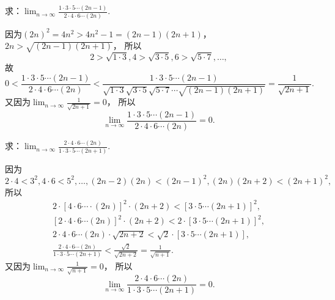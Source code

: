 \begin{example}
求：\(\lim_{n\to\infty} \frac{1 \cdot 3 \cdot 5 \dotsm (2n-1)}{2 \cdot 4 \cdot 6 \dotsm (2n)}\).
\begin{solution}
因为\((2n)^2 = 4n^2 > 4n^2-1 = (2n-1)(2n+1)\)，\(2n > \sqrt{(2n-1)(2n+1)}\)，
所以\[
	2 > \sqrt{1 \cdot 3},
	4 > \sqrt{3 \cdot 5},
	6 > \sqrt{5 \cdot 7},
	\dotsc,
\]
故\[
	0 < \frac{1 \cdot 3 \cdot 5 \dotsm (2n-1)}{2 \cdot 4 \cdot 6 \dotsm (2n)}
	< \frac{1 \cdot 3 \cdot 5 \dotsm (2n-1)}{\sqrt{1 \cdot 3} \sqrt{3 \cdot 5} \sqrt{5 \cdot 7} \dotsm \sqrt{(2n-1)(2n+1)}}
	= \frac{1}{\sqrt{2n+1}}.
\]
又因为\(\lim_{n\to\infty} \frac{1}{\sqrt{2n+1}} = 0\)，
所以\begin{equation}\label{equation:数列极限.重要极限4}
	\lim_{n\to\infty} \frac{1 \cdot 3 \cdot 5 \dotsm (2n-1)}{2 \cdot 4 \cdot 6 \dotsm (2n)} = 0.
\end{equation}
\end{solution}
\end{example}

\begin{example}
求：\(\lim_{n\to\infty} \frac{2 \cdot 4 \cdot 6 \dotsm (2n)}{1 \cdot 3 \cdot 5 \dotsm (2n+1)}\).
\begin{solution}
因为\[
	2 \cdot 4 < 3^2,
	4 \cdot 6 < 5^2,
	\dotsc,
	(2n-2)(2n) < (2n-1)^2,
	(2n)(2n+2) < (2n+1)^2,
\]
所以\begin{gather*}
	2 \cdot [4 \cdot 6 \dotsm \cdot (2n)]^2 \cdot (2n+2)
	< [3 \cdot 5 \dotsm (2n+1)]^2, \\
	[2 \cdot 4 \cdot 6 \dotsm (2n)]^2 \cdot (2n+2)
	< 2 \cdot [3 \cdot 5 \dotsm (2n+1)]^2, \\
	2 \cdot 4 \cdot 6 \dotsm (2n) \cdot \sqrt{2n+2}
	< \sqrt2 \cdot [3 \cdot 5 \dotsm (2n+1)], \\
	\frac{2 \cdot 4 \cdot 6 \dotsm (2n)}{1 \cdot 3 \cdot 5 \dotsm (2n+1)}
	< \frac{\sqrt2}{\sqrt{2n+2}}
	= \frac1{\sqrt{n+1}}.
\end{gather*}
又因为\(\lim_{n\to\infty} \frac1{\sqrt{n+1}} = 0\)，
所以\begin{equation}\label{equation:数列极限.重要极限5}
	\lim_{n\to\infty} \frac{2 \cdot 4 \cdot 6 \dotsm (2n)}{1 \cdot 3 \cdot 5 \dotsm (2n+1)} = 0.
\end{equation}
\end{solution}
\end{example}

